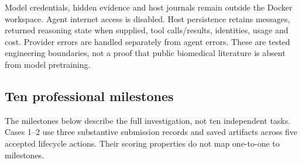 \documentclass[11pt,a4paper]{article}
\begin{document}
Model credentials, hidden evidence and host journals remain outside the Docker workspace. Agent internet access is disabled. Host persistence retains messages, returned reasoning state when supplied, tool calls/results, identities, usage and cost. Provider errors are handled separately from agent errors. These are tested engineering boundaries, not a proof that public biomedical literature is absent from model pretraining.

\subsection{Ten professional milestones}

The milestones below describe the full investigation, not ten independent tasks. Cases 1--2 use three substantive submission records and saved artifacts across five accepted lifecycle actions. Their scoring properties do not map one-to-one to milestones.
\end{document}
